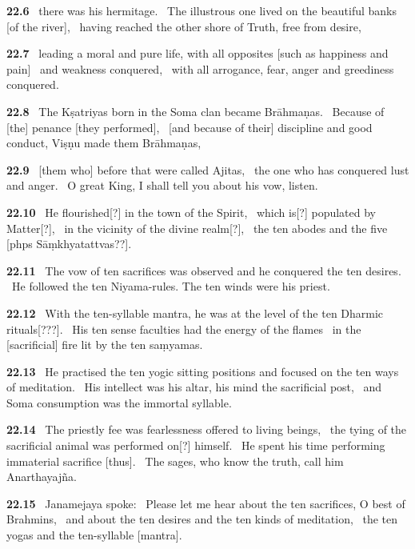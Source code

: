 \documentclass{article}
\begin{document}
\textbf{22.6}%
\ there was his hermitage.%
\ The illustrous one lived on the beautiful banks [of the river],%
\              having reached the other shore of Truth, free from desire,%


\textbf{22.7}%
\ leading a moral and pure life, with all opposites [such as happiness and pain]%
\                                 and weakness conquered,%
\ with all arrogance, fear, anger and greediness conquered.%


\textbf{22.8}%
\ The Kṣatriyas born in the Soma clan became Brāhmaṇas.%
\ Because of [the] penance [they performed],%
\              [and because of their] discipline and good conduct, Viṣṇu made them Brāhmaṇas,%


\textbf{22.9}%
\ [them who] before that were called Ajitas,%
\                      the one who has conquered lust and anger.%
\ O great King, I shall tell you about his vow, listen.%


\textbf{22.10}%
\ He flourished[?] in the town of the Spirit,%
\              which is[?] populated by Matter[?],%
\ in the vicinity of the divine realm[?],%
\              the ten abodes and the five [phps Sāṃkhyatattvas??].%


\textbf{22.11}%
\ The vow of ten sacrifices was observed and he conquered the ten desires.%
\ He followed the ten Niyama-rules. The ten winds were his priest.%


\textbf{22.12}%
\ With the ten-syllable mantra, he was at the level of the ten Dharmic rituals[???].%
\ His ten sense faculties had the energy of the flames%
\                         in the [sacrificial] fire lit by the ten saṃyamas.%


\textbf{22.13}%
\ He practised the ten yogic sitting positions and focused on the ten ways of meditation.%
\ His intellect was his altar, his mind the sacrificial post,%
\                         and Soma consumption was the immortal syllable.%


\textbf{22.14}%
\ The priestly fee was fearlessness offered to living beings,%
\                      the tying of the sacrificial animal was performed on[?] himself.%
\ He spent his time performing immaterial sacrifice [thus].%
\ The sages, who know the truth, call him Anarthayajña.%


\textbf{22.15}%
\ Janamejaya spoke:%
\ Please let me hear about the ten sacrifices, O best of Brahmins,%
\ and about the ten desires and the ten kinds of meditation,%
\              the ten yogas and the ten-syllable [mantra].%
\end{document}
